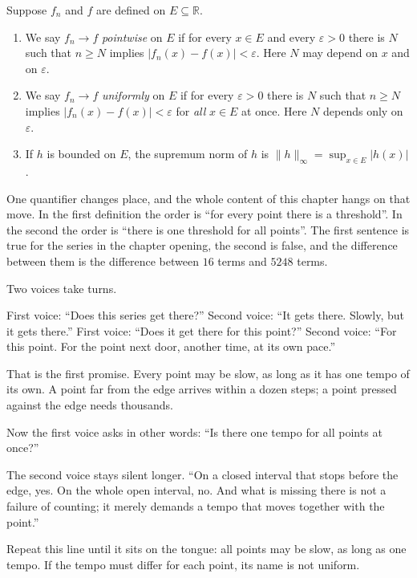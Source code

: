 \begin{definisi}
Suppose $f_n$ and $f$ are defined on $E\subseteq\mathbb{R}$.
\begin{enumerate}
\item We say $f_n\to f$ \emph{pointwise} on $E$
      if for every $x\in E$ and every
      $\varepsilon>0$ there is $N$ such that $n\ge N$ implies
      $|f_n(x)-f(x)|<\varepsilon$. Here $N$ may depend on $x$ and
      on $\varepsilon$.
\item We say $f_n\to f$ \emph{uniformly} on
      $E$ if for every $\varepsilon>0$ there is $N$ such that $n\ge N$
      implies $|f_n(x)-f(x)|<\varepsilon$ for \emph{all} $x\in E$
      at once. Here $N$ depends only on $\varepsilon$.
\item If $h$ is bounded on $E$, the supremum norm of $h$
      is $\|h\|_\infty=\sup_{x\in E}|h(x)|$.
\end{enumerate}
\end{definisi}


One quantifier changes place, and the whole content of this chapter hangs on
that move. In the first definition the order is ``for every point there is a
threshold''. In the second the order is ``there is one threshold for all points''.
The first sentence is true for the series in the chapter opening, the second is false, and
the difference between them is the difference between $16$ terms and $5248$ terms.

\begin{bacakeras}
Two voices take turns.

First voice: ``Does this series get there?''
Second voice: ``It gets there. Slowly, but it gets there.''
First voice: ``Does it get there for this point?''
Second voice: ``For this point. For the point next door, another time, at its own pace.''

That is the first promise. Every point may be slow, as long as it has one tempo
of its own. A point far from the edge arrives within a dozen steps;
a point pressed against the edge needs thousands.

Now the first voice asks in other words: ``Is there one tempo for
all points at once?''

The second voice stays silent longer. ``On a closed interval that stops before the edge,
yes. On the whole open interval, no. And what is missing there is not a failure of
counting; it merely demands a tempo that moves together with the point.''

Repeat this line until it sits on the tongue: all points may be slow, as long as one
tempo. If the tempo must differ for each point, its name is not uniform.
\end{bacakeras}

